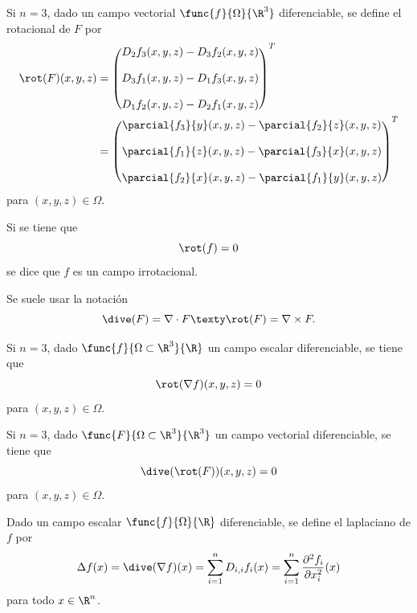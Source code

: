 \documentclass[a4,11pt]{aleph-notas}
\begin{document}
\begin{defi}[Rotacional en $\R^3$]
    Si $n=3$, dado un campo vectorial $\func{f}{\Omega}{\R^3}$ diferenciable, se define el rotacional de $F$ por
    \begin{align*}
        \rot(F)(x,y,z) 
        & = \begin{pmatrix}
                D_2 f_3(x,y,z) - D_3 f_2(x,y,z) \\[4mm]
                D_3 f_1(x,y,z) - D_1 f_3(x,y,z) \\[4mm]
                D_1 f_2(x,y,z) - D_2 f_1(x,y,z) 
            \end{pmatrix}^T \\
        & = \begin{pmatrix}
                \parcial{f_3}{y}(x,y,z) - \parcial{f_2}{z}(x,y,z) \\[4mm]
                \parcial{f_1}{z}(x,y,z) - \parcial{f_3}{x}(x,y,z) \\[4mm]
                \parcial{f_2}{x}(x,y,z) - \parcial{f_1}{y}(x,y,z) 
            \end{pmatrix}^T 
    \end{align*}
    para $(x,y,z)\in \Omega$.
\end{defi}

\begin{advertencia}
    Si se tiene que
    \[
        \rot(f) = 0
    \]
    se dice que $f$ es un campo irrotacional.
\end{advertencia}

\begin{advertencia}
    Se suele usar la notación
    \[
        \dive(F) = \nabla\cdot F
        \texty
        \rot(F) = \nabla \times F.
    \]
\end{advertencia}

\begin{prop}
    Si $n=3$, dado $\func{f}{\Omega\subset\R^3}{\R}$ un campo escalar diferenciable, se tiene que
    \[
        \rot(\nabla f)(x,y,z)=0
    \]
    para $(x,y,z)\in \Omega$.
\end{prop}

\begin{prop}
    Si $n=3$, dado $\func{F}{\Omega\subset\R^3}{\R^3}$ un campo vectorial diferenciable, se tiene que
    \[
        \dive(\rot(F))(x,y,z)=0
    \]
    para $(x,y,z)\in \Omega$.
\end{prop}

\begin{defi}[Laplaciano]
    Dado un campo escalar $\func{f}{\Omega}{\R}$ diferenciable, se define el laplaciano de $f$ por
    \[
        \Delta f (x) = \dive(\nabla f)(x) = \sum_{i=1}^n D_{i,i} f_i(x) = \sum_{i=1}^n \frac{\partial^2 f_i}{\partial x_i^2}(x)
    \]
    para todo $x\in\R^n$.
\end{defi}
\end{document}
